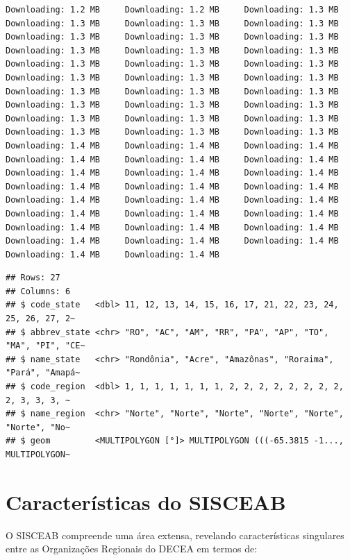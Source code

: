 \documentclass[
]{book}
\begin{document}
\begin{verbatim}
Downloading: 1.2 MB     Downloading: 1.2 MB     Downloading: 1.3 MB     Downloading: 1.3 MB     Downloading: 1.3 MB     Downloading: 1.3 MB     Downloading: 1.3 MB     Downloading: 1.3 MB     Downloading: 1.3 MB     Downloading: 1.3 MB     Downloading: 1.3 MB     Downloading: 1.3 MB     Downloading: 1.3 MB     Downloading: 1.3 MB     Downloading: 1.3 MB     Downloading: 1.3 MB     Downloading: 1.3 MB     Downloading: 1.3 MB     Downloading: 1.3 MB     Downloading: 1.3 MB     Downloading: 1.3 MB     Downloading: 1.3 MB     Downloading: 1.3 MB     Downloading: 1.3 MB     Downloading: 1.3 MB     Downloading: 1.3 MB     Downloading: 1.3 MB     Downloading: 1.3 MB     Downloading: 1.3 MB     Downloading: 1.3 MB     Downloading: 1.4 MB     Downloading: 1.4 MB     Downloading: 1.4 MB     Downloading: 1.4 MB     Downloading: 1.4 MB     Downloading: 1.4 MB     Downloading: 1.4 MB     Downloading: 1.4 MB     Downloading: 1.4 MB     Downloading: 1.4 MB     Downloading: 1.4 MB     Downloading: 1.4 MB     Downloading: 1.4 MB     Downloading: 1.4 MB     Downloading: 1.4 MB     Downloading: 1.4 MB     Downloading: 1.4 MB     Downloading: 1.4 MB     Downloading: 1.4 MB     Downloading: 1.4 MB     Downloading: 1.4 MB     Downloading: 1.4 MB     Downloading: 1.4 MB     Downloading: 1.4 MB     Downloading: 1.4 MB     Downloading: 1.4 MB
\end{verbatim}

\begin{verbatim}
## Rows: 27
## Columns: 6
## $ code_state   <dbl> 11, 12, 13, 14, 15, 16, 17, 21, 22, 23, 24, 25, 26, 27, 2~
## $ abbrev_state <chr> "RO", "AC", "AM", "RR", "PA", "AP", "TO", "MA", "PI", "CE~
## $ name_state   <chr> "Rondônia", "Acre", "Amazônas", "Roraima", "Pará", "Amapá~
## $ code_region  <dbl> 1, 1, 1, 1, 1, 1, 1, 2, 2, 2, 2, 2, 2, 2, 2, 2, 3, 3, 3, ~
## $ name_region  <chr> "Norte", "Norte", "Norte", "Norte", "Norte", "Norte", "No~
## $ geom         <MULTIPOLYGON [°]> MULTIPOLYGON (((-65.3815 -1..., MULTIPOLYGON~
\end{verbatim}

\hypertarget{caracteruxedsticas-do-sisceab}{%
\chapter{Características do SISCEAB}\label{caracteruxedsticas-do-sisceab}}

O SISCEAB compreende uma área extensa, revelando características singulares entre as Organizações Regionais do DECEA em termos de:
\end{document}
